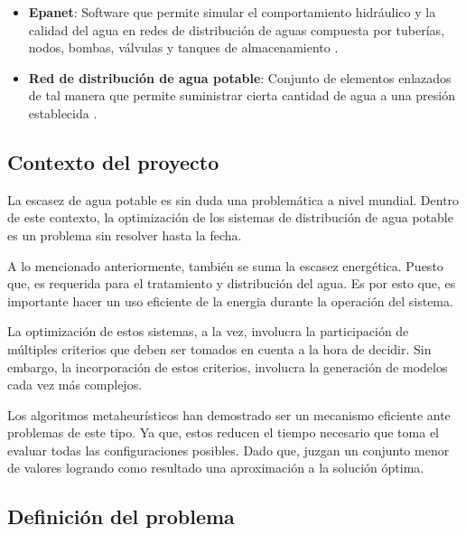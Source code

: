 \documentclass[11pt,letterpaper]{article}
\begin{document}
\begin{itemize}
\item \textbf{Epanet}: Software que permite simular el comportamiento hidráulico y la calidad del agua en redes de distribución de aguas compuesta por tuberías, nodos, bombas, válvulas y tanques de almacenamiento \cite{Rossman2017}. 
\item \textbf{Red de distribución de agua potable}: Conjunto de elementos enlazados de tal manera que permite suministrar cierta cantidad de agua a una presión establecida \cite{Doctoral2012}.
 
\end{itemize}

\subsection{Contexto del proyecto} 

La escasez de agua potable es sin duda una problemática a nivel mundial. Dentro de este contexto, la optimización de los sistemas de distribución de agua potable es un problema sin resolver hasta la fecha. 

A lo mencionado anteriormente, también se suma la escasez energética. Puesto que, es requerida para el tratamiento y distribución del agua. Es por esto que, es importante hacer un uso eficiente de la energia durante la operación del sistema.

La optimización de estos sistemas, a la vez, involucra la participación de múltiples criterios que deben ser tomados en cuenta a la hora de decidir. Sin embargo, la incorporación de estos criterios, involucra la generación de modelos cada vez más complejos.

Los algoritmos metaheurísticos han demostrado ser un mecanismo eficiente ante problemas de este tipo. Ya que, estos reducen el tiempo necesario que toma el evaluar todas las configuraciones posibles. Dado que, juzgan un conjunto menor de valores logrando como resultado una aproximación a la solución óptima.

\subsection{Definición del problema} 
\end{document}
